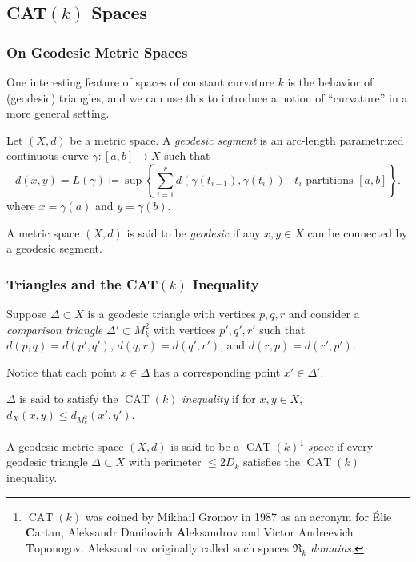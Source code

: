 \documentclass{beamer}
\DeclareMathOperator{\CAT}{CAT}
\theoremstyle{definition}
\begin{document}
\subsection{CAT$(k)$ Spaces}

\begin{frame}
    \frametitle{On Geodesic Metric Spaces}

    One interesting feature of spaces of constant curvature $k$ is the behavior
    of (geodesic) triangles, and we can use this to introduce a notion of ``curvature''
    in a more general setting.

    \begin{definition}
        Let $(X,d)$ be a metric space. A \emph{geodesic segment} is an arc-length parametrized
        continuous curve $\gamma : [a,b] \to X$ such that
        \[
          d(x,y) = L(\gamma)
          \coloneqq \sup\left\{\sum_{i=1}^r d(\gamma(t_{i-1}),\gamma(t_i))
          \mid t_i \text{ partitions } [a,b] \right\}.
        \]
        where $x = \gamma(a)$ and $y = \gamma(b)$.

        A metric space $(X,d)$ is said to be \emph{geodesic} if any $x, y \in X$ can be connected
        by a geodesic segment.
    \end{definition}

\end{frame}

\begin{frame}
    \frametitle{Triangles and the CAT$(k)$ Inequality}

    Suppose $\Delta \subset X$ is a geodesic triangle with vertices $p,q,r$ and consider a
    \emph{comparison triangle} $\Delta' \subset M_k^2$ with vertices $p',q',r'$ such that
    $d(p,q) = d(p',q')$, $d(q,r) = d(q',r')$, and $d(r,p) = d(r',p')$.

    Notice that each point $x \in \Delta$ has a corresponding point $x' \in \Delta'$.

    $\Delta$ is said to satisfy the $\CAT(k)$
    \emph{inequality} if for $x, y \in X$, $d_X(x,y) \leq d_{M^2_k}(x',y')$.

    \begin{definition}
        A geodesic metric space $(X,d)$ is said to be a $\CAT(k)$\footnote{$\CAT(k)$
        was coined by Mikhail Gromov in 1987 as an acronym for Élie \textbf{C}artan,
        Aleksandr Danilovich \textbf{A}leksandrov and Victor Andreevich \textbf{T}oponogov.
        Aleksandrov originally called such spaces \emph{$\mathfrak{R}_k$ domains}.}
        \emph{space} if every
        geodesic triangle $\Delta \subset X$ with perimeter $\leq 2D_k$ satisfies the
        $\CAT(k)$ inequality.
    \end{definition}

\end{frame}
\end{document}
